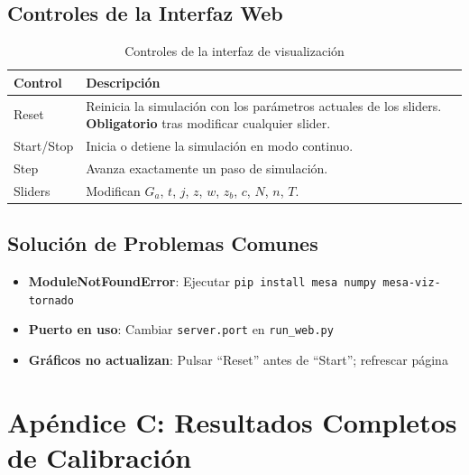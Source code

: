 \subsection{Controles de la Interfaz Web}

\begin{table}[h]
\centering
\caption{Controles de la interfaz de visualización}
\begin{tabular}{lp{9cm}}
\toprule
\textbf{Control} & \textbf{Descripción} \\
\midrule
Reset & Reinicia la simulación con los parámetros actuales de los sliders. \textbf{Obligatorio} tras modificar cualquier slider. \\
Start/Stop & Inicia o detiene la simulación en modo continuo. \\
Step & Avanza exactamente un paso de simulación. \\
Sliders & Modifican $G_a$, $t$, $j$, $z$, $w$, $z_b$, $c$, $N$, $n$, $T$. \\
\bottomrule
\end{tabular}
\end{table}

\subsection{Solución de Problemas Comunes}

\begin{itemize}
    \item \textbf{ModuleNotFoundError}: Ejecutar \texttt{pip install mesa numpy mesa-viz-tornado}
    \item \textbf{Puerto en uso}: Cambiar \texttt{server.port} en \texttt{run\_web.py}
    \item \textbf{Gráficos no actualizan}: Pulsar ``Reset'' antes de ``Start''; refrescar página
\end{itemize}


\section{Apéndice C: Resultados Completos de Calibración}

